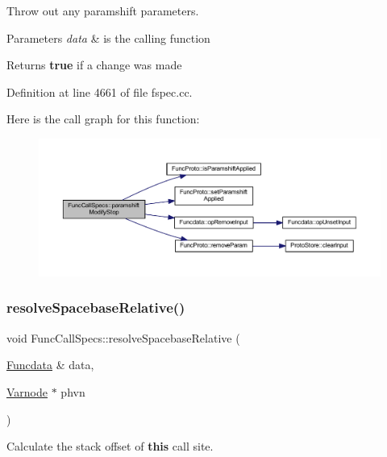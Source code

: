 Throw out any paramshift parameters. 


\begin{DoxyParams}{Parameters}
{\em data} & is the calling function \\
\hline
\end{DoxyParams}
\begin{DoxyReturn}{Returns}
{\bfseries{true}} if a change was made 
\end{DoxyReturn}


Definition at line 4661 of file fspec.\+cc.

Here is the call graph for this function\+:
\nopagebreak
\begin{figure}[H]
\begin{center}
\leavevmode
\includegraphics[width=350pt]{class_func_call_specs_a01e16ebebb71bdc63fb884c8d0e3b7e3_cgraph}
\end{center}
\end{figure}
\mbox{\label{class_func_call_specs_a5ad2a3f374049dec6fdf0f9d20295305}} 
\subsubsection{\texorpdfstring{resolveSpacebaseRelative()}{resolveSpacebaseRelative()}}
{\footnotesize\ttfamily void Func\+Call\+Specs\+::resolve\+Spacebase\+Relative (\begin{DoxyParamCaption}\item[{\mbox{\hyperlink{class_funcdata}{Funcdata}} \&}]{data,  }\item[{\mbox{\hyperlink{class_varnode}{Varnode}} $\ast$}]{phvn }\end{DoxyParamCaption})}



Calculate the stack offset of {\bfseries{this}} call site. 

